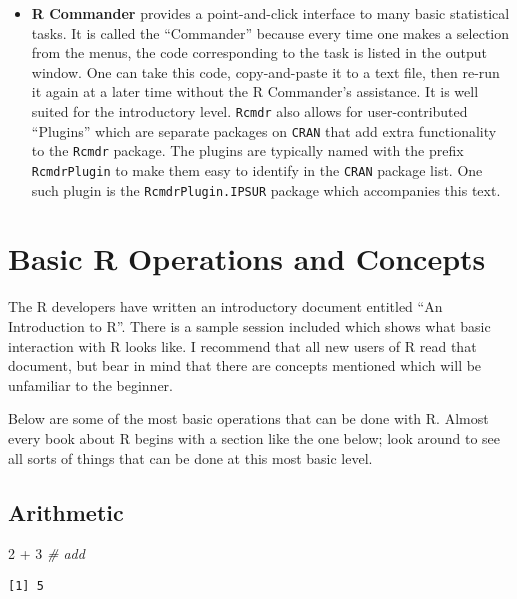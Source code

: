 \documentclass[]{book}
\newenvironment{Shaded}{\begin{snugshade}}{\end{snugshade}}
\newcommand{\DecValTok}[1]{\textcolor[rgb]{0.00,0.00,0.81}{{#1}}}
\newcommand{\StringTok}[1]{\textcolor[rgb]{0.31,0.60,0.02}{{#1}}}
\newcommand{\CommentTok}[1]{\textcolor[rgb]{0.56,0.35,0.01}{\textit{{#1}}}}
\newcommand{\NormalTok}[1]{{#1}}
\providecommand{\tightlist}{%
  \setlength{\itemsep}{0pt}\setlength{\parskip}{0pt}}
\numberwithin{equation}{chapter}
\numberwithin{figure}{chapter}
\theoremstyle{plain}
\theoremstyle{definition}
\theoremstyle{remark}
\theoremstyle{definition}
\theoremstyle{definition}
\theoremstyle{remark}
\begin{document}
\begin{itemize}
\tightlist
\item
  \textbf{R Commander} provides a point-and-click interface to many
  basic statistical tasks. It is called the ``Commander'' because every
  time one makes a selection from the menus, the code corresponding to
  the task is listed in the output window. One can take this code,
  copy-and-paste it to a text file, then re-run it again at a later time
  without the R Commander's assistance. It is well suited for the
  introductory level. \texttt{Rcmdr} \autocite{Rcmdr} also allows for
  user-contributed ``Plugins'' which are separate packages on
  \texttt{CRAN} that add extra functionality to the \texttt{Rcmdr}
  package. The plugins are typically named with the prefix
  \texttt{RcmdrPlugin} to make them easy to identify in the
  \texttt{CRAN} package list. One such plugin is the
  \texttt{RcmdrPlugin.IPSUR} package \autocite{RcmdrPlugin.IPSUR} which
  accompanies this text.
\end{itemize}

\section{Basic R Operations and Concepts}\label{sec-Basic-R-Operations}

The R developers have written an introductory document entitled ``An
Introduction to R''. There is a sample session included which shows what
basic interaction with R looks like. I recommend that all new users of R
read that document, but bear in mind that there are concepts mentioned
which will be unfamiliar to the beginner.

Below are some of the most basic operations that can be done with R.
Almost every book about R begins with a section like the one below; look
around to see all sorts of things that can be done at this most basic
level.

\subsection{Arithmetic}\label{sub-Arithmetic}

\begin{Shaded}
\begin{Highlighting}[]
\DecValTok{2} \NormalTok{+}\StringTok{ }\DecValTok{3}       \CommentTok{# add}
\end{Highlighting}
\end{Shaded}

\begin{verbatim}
[1] 5
\end{verbatim}
\end{document}
